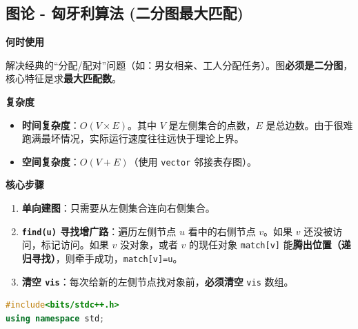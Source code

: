 \documentclass[10pt,landscape,a4paper]{article}
\begin{document}
\begin{multicols*}{3}
\subsection*{图论 - 匈牙利算法 (二分图最大匹配)}
\par\addvspace{0.7ex}\noindent\textbf{何时使用}\par\nobreak
解决经典的“分配/配对”问题（如：男女相亲、工人分配任务）。图\textbf{必须是二分图}，核心特征是求\textbf{最大匹配数}。\par
\par\addvspace{0.7ex}\noindent\textbf{复杂度}\par\nobreak
\begin{itemize}
\item \textbf{时间复杂度}：$O(V \times E)$。其中 $V$ 是左侧集合的点数，$E$ 是总边数。由于很难跑满最坏情况，实际运行速度往往远快于理论上界。
\item \textbf{空间复杂度}：$O(V + E)$（使用 \texttt{v\allowbreak{}e\allowbreak{}c\allowbreak{}t\allowbreak{}o\allowbreak{}r} 邻接表存图）。
\end{itemize}
\par\addvspace{0.7ex}\noindent\textbf{核心步骤}\par\nobreak
\begin{enumerate}[start=1]
\item \textbf{单向建图}：只需要从左侧集合连向右侧集合。
\item \textbf{\texttt{f\allowbreak{}i\allowbreak{}n\allowbreak{}d\allowbreak{}(\allowbreak{}u\allowbreak{})} 寻找增广路}：遍历左侧节点 $u$ 看中的右侧节点 $v$。如果 $v$ 还没被访问，标记访问。如果 $v$ 没对象，或者 $v$ 的现任对象 \texttt{m\allowbreak{}a\allowbreak{}t\allowbreak{}c\allowbreak{}h\allowbreak{}[\allowbreak{}v\allowbreak{}]} 能\textbf{腾出位置（递归寻找）}，则牵手成功，\texttt{m\allowbreak{}a\allowbreak{}t\allowbreak{}c\allowbreak{}h\allowbreak{}[\allowbreak{}v\allowbreak{}]\allowbreak{}=\allowbreak{}u}。
\item \textbf{清空 \texttt{v\allowbreak{}i\allowbreak{}s}}：每次给新的左侧节点找对象前，\textbf{必须清空} \texttt{v\allowbreak{}i\allowbreak{}s} 数组。
\end{enumerate}
\par{}\par
\begin{lstlisting}[language=C++]
#include<bits/stdc++.h>
using namespace std;


\end{lstlisting}
\end{multicols*}
\end{document}
